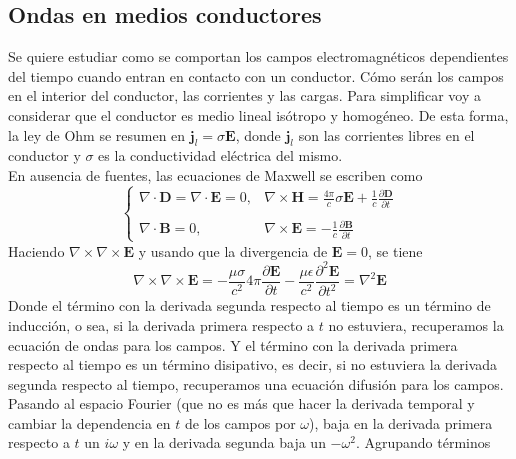 \subsection{Ondas en medios conductores}
Se quiere estudiar como se comportan los campos electromagnéticos dependientes del tiempo cuando entran en contacto con un conductor. Cómo serán los campos en el interior del conductor, las corrientes y las cargas. Para simplificar voy a considerar que el conductor es medio lineal isótropo y homogéneo. De esta forma, la ley de Ohm se resumen en $\textbf{j}_{l} = \sigma \textbf{E}$, donde $\textbf{j}_{l}$ son las corrientes libres en el conductor y $\sigma$ es la conductividad eléctrica del mismo.\\
\indent En ausencia de fuentes, las ecuaciones de Maxwell se escriben como
\begin{equation*}
    \left\{
        \begin{matrix}
            \nabla \cdot \textbf{D} = \nabla \cdot \textbf{E} = 0,
            &
            \nabla \times \textbf{H} = 
            \frac{4\pi}{c}\sigma\textbf{E}
            + \frac{1}{c}\frac{\partial\textbf{D}}{\partial t}
            \\
            & \\
            \nabla \cdot \textbf{B} = 0,
            &
            \nabla \times \textbf{E} =
            -\frac{1}{c}
            \frac{\partial \textbf{B}}{ \partial t}
        \end{matrix}
    \right.
\end{equation*}
Haciendo $\nabla\times\nabla\times \textbf{E}$ y usando que la divergencia de $\textbf{E} = 0$, se tiene
\begin{equation*}
    \nabla \times \nabla \times \textbf{E} = 
    -\frac{\mu \sigma}{c^{2}}4\pi\frac{\partial \textbf{E}}{\partial t}
    -\frac{\mu \epsilon}{c^{2}}\frac{\partial^{2} \textbf{E}}{\partial t^{2}}
    = \nabla^{2}\textbf{E}
\end{equation*}
Donde el término con la derivada segunda respecto al tiempo es un término de inducción, o sea, si la derivada primera respecto a $t$ no estuviera, recuperamos la ecuación de ondas para los campos. Y el término con la derivada primera respecto al tiempo es un término disipativo, es decir, si no estuviera la derivada segunda respecto al tiempo, recuperamos una ecuación difusión para los campos.\\
\indent Pasando al espacio Fourier (que no es más que hacer la derivada temporal y cambiar la dependencia en $t$ de los campos por $\omega$), baja en la derivada primera respecto a $t$ un $i\omega$ y en la derivada segunda baja un $-\omega^{2}$. Agrupando términos
